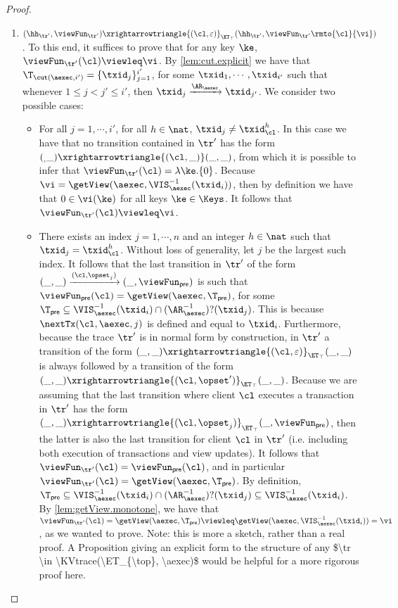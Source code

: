 \begin{proof}
\begin{itemize}
\begin{enumerate}
\item $(\hh_{\tr'}, \viewFun_{\tr'}) \xrightarrowtriangle{(\cl, \varepsilon)}_{\ET_{\top}} (\hh_{\tr'}, \viewFun_{\tr'}\rmto{\cl}{\vi})$. 
To this end, it suffices to prove that for any key $\ke$, $\viewFun_{\tr'}(\cl) \viewleq \vi$. 
By \cref{lem:cut.explicit} we have that $\T_{\cut(\aexec, i')} = \{\txid_{j}\}_{j=1}^{i'}$, for 
some $\txid_{1},\cdots, \txid_{i'}$ such that whenever $1 \leq j < j' \leq i'$, then 
$\txid_{j} \xrightarrow{\AR_{\aexec}} \txid_{j'}$. We consider two possible cases: 

\begin{itemize}
\item For all $j =1,\cdots, i'$, for all $h \in \nat$, $\txid_{j} \neq \txid_{\cl}^{h}$. In 
this case we have that no transition contained in $\tr'$ has the form 
$(_, \_) \xrightarrowtriangle{(\cl, \_)} (\_, \_)$, from which it is possible to infer 
that  $\viewFun_{\tr'}(\cl) = \lambda \ke. \{0\}$. Because $\vi = \getView(\aexec, \VIS^{-1}_{\aexec}(\txid_{i}))$, 
then by definition we have that $0 \in \vi(\ke)$ for all keys $\ke \in \Keys$. It follows that 
$\viewFun_{\tr'}(\cl) \viewleq \vi$. 
\item There exists an index $j = 1,\cdots, n$ and an integer $h \in \nat$ such that $\txid_{j} = \txid_{\cl}^{h}$. 
Without loss of generality, let $j$ be the largest such index. It follows that the last transition in $\tr'$ of the form 
$(\_, \_) \xrightarrow{(\cl, \opset_{j})} (\_, \viewFun_{\mathsf{pre}})$ is such that $\viewFun_{\mathsf{pre}}(\cl) = 
\getView(\aexec, \T_{\mathsf{pre}})$, for some $\T_{\mathsf{pre}} \subseteq \VIS^{-1}_{\aexec}(\txid_{i}) \cap 
(\AR^{-1}_{\aexec})?(\txid_{j})$. This is because $\nextTx(\cl, \aexec, j)$  is defined and equal to $\txid_{i}$. 
Furthermore, because the trace $\tr'$ is in normal form by construction, in $\tr'$ a transition of the form 
$(\_, \_) \xrightarrowtriangle{(\cl, \varepsilon)}_{\ET_{\top}} (\_, \_)$ is always followed by a transition of the form
$(\_, \_) \xrightarrowtriangle{(\cl, \opset')}_{\ET_{\top}} (\_, \_)$. Because we are assuming that the last transition where client 
$\cl$ executes a transaction in $\tr'$ has the form $(\_, \_) \xrightarrowtriangle{(\cl, \opset_{j})}_{\ET_{\top}} (\_, \viewFun_{\mathsf{pre}})$, 
then the latter is also the last transition for client $\cl$ in $\tr'$ (i.e. including both execution of transactions and view updates). 
It follows that $\viewFun_{\tr'}(\cl) = \viewFun_{\mathsf{pre}}(\cl)$, and in particular 
$\viewFun_{\tr'}(\cl) = \getView(\aexec, \T_{\mathsf{pre}})$. By definition, 
$\T_{\mathsf{pre}} \subseteq  \VIS^{-1}_{\aexec}(\txid_{i}) \cap (\AR^{-1}_{\aexec})?(\txid_{j}) 
\subseteq \VIS^{-1}_{\aexec}(\txid_{i})$. By  \cref{lem:getView.monotone}, 
we have that $\viewFun_{\tr'}(\cl) = \getView(\aexec, \T_{\mathsf{pre}}) \viewleq 
\getView(\aexec, \VIS^{-1}_{\aexec}(\txid_{i})) = \vi$, as we wanted to prove.
\ac{Note: this is more a sketch, rather than a real proof. A Proposition giving an explicit form to the 
structure of any $\tr \in \KVtrace(\ET_{\top}, \aexec)$ would be helpful for a more rigorous proof here.}
\end{itemize}



\end{enumerate}
\end{itemize}
\end{proof}
